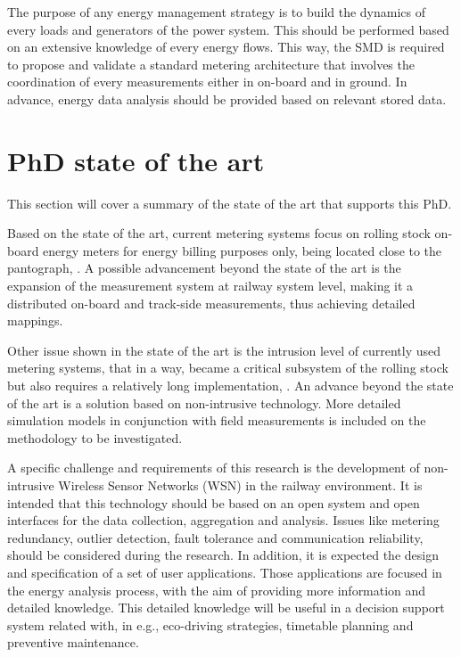 The purpose of any energy management strategy is to build the dynamics of every loads and generators of the power system. 
This should be performed based on an extensive knowledge of every energy flows. 
This way, the SMD is required to propose and validate a standard metering architecture that involves the coordination of every measurements either in on-board and in ground. 
In advance, energy data analysis should be provided based on relevant stored data. 

\section{PhD state of the art}

This section will cover a summary of the state of the art that supports this PhD.

Based on the state of the art, current metering systems focus on rolling stock on-board energy meters for energy billing purposes only, being located close to the pantograph, \cite{shift2rail2015}.
A possible advancement beyond the state of the art is the expansion of the measurement system at railway system level, making it a distributed on-board and track-side measurements, thus achieving detailed mappings. 

\vspace{2em}

Other issue shown in the state of the art is the intrusion level of currently used metering systems, that in a way, became a critical subsystem of the rolling stock but also requires a relatively long implementation, \cite{shift2rail2015}. 
An advance beyond the state of the art is a solution based on non-intrusive technology. More detailed simulation models in conjunction with field measurements is included on the methodology to be investigated.




A specific challenge and requirements of this research is the development of non-intrusive Wireless Sensor Networks (WSN)  in the railway environment. 
It is intended that this technology should be based on an open system and open interfaces for the data collection, aggregation and analysis. 
Issues like metering redundancy, outlier detection, fault tolerance and communication reliability, should be considered during the research.
In addition, it is expected the design and specification of a set of user applications.
Those applications are focused in the energy analysis process, with the aim of providing more information and detailed knowledge.
This detailed knowledge will be useful in a decision support system related with, in e.g., eco-driving strategies, timetable planning and preventive maintenance.

